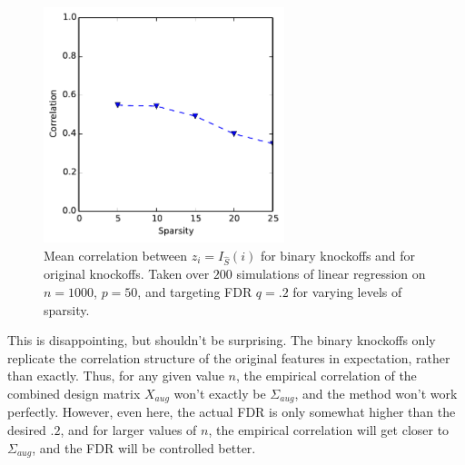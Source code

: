 \documentclass[11pt]{article}
\theoremstyle{definition}
\begin{document}
    \begin{figure}[h]
        \begin{center}
        \includegraphics[width=7cm]{images/lasso_corr_50}
    \end{center}
    \caption{\linespread{1}\selectfont{}Mean correlation between $z_i=I_{\hat S}(i)$ for binary knockoffs and for original knockoffs. Taken over $200$ simulations of linear regression on $n=1000$, $p=50$, and targeting FDR $q=.2$ for varying levels of sparsity.}  
    \end{figure}
    This is disappointing, but shouldn't be surprising. The binary knockoffs only replicate the correlation structure of the original features in expectation, rather than exactly. Thus, for any given value $n$, the empirical correlation of the combined design matrix $X_{aug}$ won't exactly be $\Sigma_{aug}$, and the method won't work perfectly. However, even here, the actual FDR is only somewhat higher than the desired $.2$, and for larger values of $n$, the empirical correlation will get closer to $\Sigma_{aug}$, and the FDR will be controlled better.

    \FloatBarrier
\end{document}

